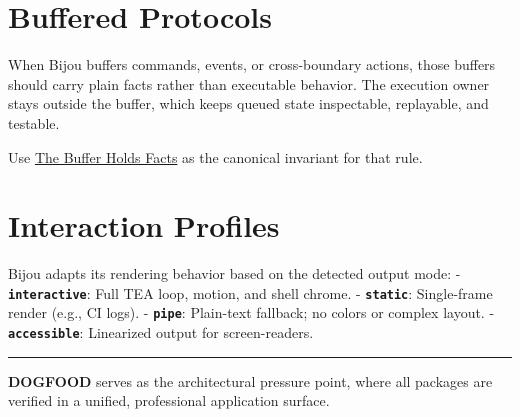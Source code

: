 \section{Buffered Protocols}\label{record-003-buffered-protocols}

When Bijou buffers commands, events, or cross-boundary actions, those buffers should carry plain facts rather than executable behavior. The execution owner stays outside the buffer, which keeps queued state inspectable, replayable, and testable.

Use \href{https://github.com/flyingrobots/bijou/blob/cbd70612140e7a450d764b3c7be1c6af878b99bc/docs/invariants/buffer-holds-facts.md}{The Buffer Holds Facts} as the canonical invariant for that rule.

\section{Interaction Profiles}\label{record-003-interaction-profiles}

Bijou adapts its rendering behavior based on the detected output mode: - \textbf{\texttt{i\allowbreak{}n\allowbreak{}t\allowbreak{}e\allowbreak{}r\allowbreak{}a\allowbreak{}c\allowbreak{}t\allowbreak{}i\allowbreak{}v\allowbreak{}e}}: Full TEA loop, motion, and shell chrome. - \textbf{\texttt{s\allowbreak{}t\allowbreak{}a\allowbreak{}t\allowbreak{}i\allowbreak{}c}}: Single-frame render (e.g., CI logs). - \textbf{\texttt{p\allowbreak{}i\allowbreak{}p\allowbreak{}e}}: Plain-text fallback; no colors or complex layout. - \textbf{\texttt{a\allowbreak{}c\allowbreak{}c\allowbreak{}e\allowbreak{}s\allowbreak{}s\allowbreak{}i\allowbreak{}b\allowbreak{}l\allowbreak{}e}}: Linearized output for screen-readers.

\begin{center}\rule{0.5\linewidth}{0.5pt}\end{center}

\textbf{DOGFOOD} serves as the architectural pressure point, where all packages are verified in a unified, professional application surface.

